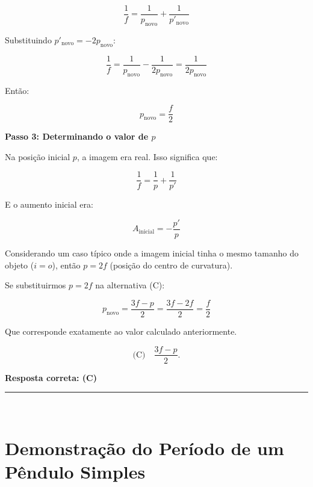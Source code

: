 \documentclass[a4paper,12pt]{article}
\begin{document}
\begin{flushleft}
\begin{equation}
\frac{1}{f} = \frac{1}{p_{\text{novo}}} + \frac{1}{p'_{\text{novo}}}
\end{equation}

Substituindo $p'_{\text{novo}} = -2p_{\text{novo}}$:

\begin{equation}
\frac{1}{f} = \frac{1}{p_{\text{novo}}} - \frac{1}{2p_{\text{novo}}} = \frac{1}{2p_{\text{novo}}}
\end{equation}

Então:

\begin{equation}
p_{\text{novo}} = \frac{f}{2}
\end{equation}

\textbf{Passo 3: Determinando o valor de $p$}

Na posição inicial $p$, a imagem era real. Isso significa que:

\begin{equation}
\frac{1}{f} = \frac{1}{p} + \frac{1}{p'}
\end{equation}

E o aumento inicial era:

\begin{equation}
A_{\text{inicial}} = -\frac{p'}{p}
\end{equation}

Considerando um caso típico onde a imagem inicial tinha o mesmo tamanho do objeto ($i=o$), então $p = 2f$ (posição do centro de curvatura).

Se substituirmos $p=2f$ na alternativa (C):

\begin{equation}
p_{\text{novo}} = \frac{3f-p}{2} = \frac{3f-2f}{2} = \frac{f}{2}
\end{equation}

Que corresponde exatamente ao valor calculado anteriormente.

\[
\boxed{\text{(C)} \quad \dfrac{3f-p}{2}}.
\]


\textbf{Resposta correta: \colorbox{green!50}{(C)}}

\end{flushleft}
\noindent\rule{\linewidth}{0.6pt}\\

\section*{Demonstração do Período de um Pêndulo Simples}
\end{document}
